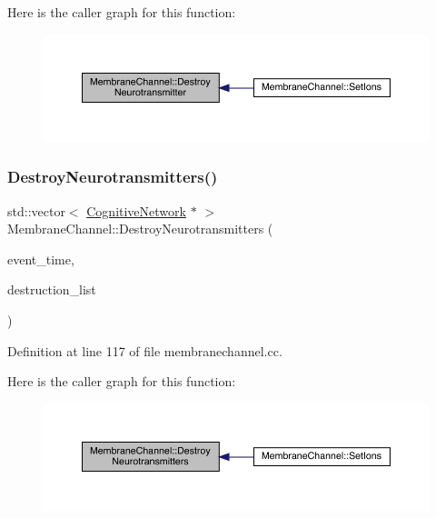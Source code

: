 Here is the caller graph for this function\+:\nopagebreak
\begin{figure}[H]
\begin{center}
\leavevmode
\includegraphics[width=350pt]{class_membrane_channel_a985d8f93077b0f93daa9c311a22917a1_icgraph}
\end{center}
\end{figure}
\mbox{\label{class_membrane_channel_ad5dfc13b89aff0c7383e052113da1d8f}} 
\subsubsection{\texorpdfstring{Destroy\+Neurotransmitters()}{DestroyNeurotransmitters()}}
{\footnotesize\ttfamily std\+::vector$<$ \hyperlink{class_cognitive_network}{Cognitive\+Network} $\ast$ $>$ Membrane\+Channel\+::\+Destroy\+Neurotransmitters (\begin{DoxyParamCaption}\item[{std\+::chrono\+::time\+\_\+point$<$ \hyperlink{universe_8h_a0ef8d951d1ca5ab3cfaf7ab4c7a6fd80}{Clock} $>$}]{event\+\_\+time,  }\item[{std\+::vector$<$ \hyperlink{class_cognitive_network}{Cognitive\+Network} $\ast$$>$}]{destruction\+\_\+list }\end{DoxyParamCaption})}



Definition at line 117 of file membranechannel.\+cc.

Here is the caller graph for this function\+:\nopagebreak
\begin{figure}[H]
\begin{center}
\leavevmode
\includegraphics[width=350pt]{class_membrane_channel_ad5dfc13b89aff0c7383e052113da1d8f_icgraph}
\end{center}
\end{figure}
\mbox{\label{class_membrane_channel_ac856b74d47b28bd8638fce9c0f12dd20}} 
